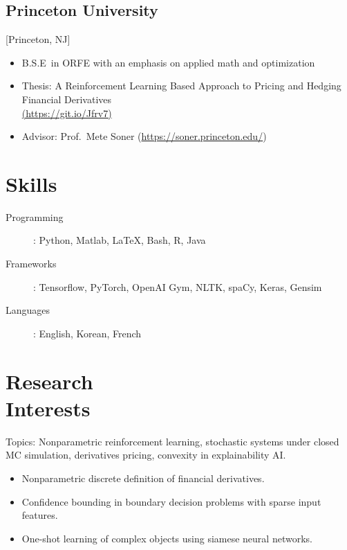 \documentclass{rkim-resume}
\begin{document}
\subsection{Princeton University}[Princeton, NJ]
\vspace{-\parskip}%
\begin{itemize}[label={}]
  \item B.S.E\ in ORFE with an emphasis on applied math and optimization
  \item Thesis: {A Reinforcement Learning Based Approach to Pricing and Hedging Financial Derivatives}\href{https://github.com/russellkim98/Thesis/blob/master/Russell-Kim-Thesis.pdf}{\\(https://git.io/Jfrv7)}
  \item Advisor: Prof.~Mete Soner (\href{https://soner.princeton.edu/}{https://soner.princeton.edu/})
\end{itemize}
\section{Skills}

\begin{description}
  \item[Programming]: Python, Matlab, \LaTeX, Bash, R, Java
  \item[Frameworks]: Tensorflow, PyTorch, OpenAI Gym, NLTK, spaCy, Keras, Gensim
  \item[Languages]: English, Korean, French
\end{description}


\section{Research \\ Interests}

Topics: Nonparametric reinforcement learning, stochastic systems under closed MC simulation, derivatives pricing, convexity in explainability AI.

\begin{itemize}
  \item Nonparametric discrete definition of financial derivatives.
  \item Confidence bounding in boundary decision problems with sparse input features.
  \item One-shot learning of complex objects using siamese neural networks.
\end{itemize}
\end{document}
